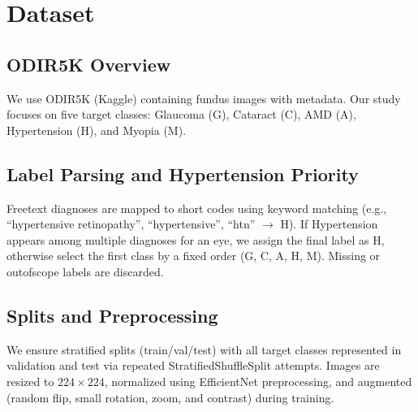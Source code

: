\chapter{Dataset}\label{sec:dataset}
\section{ODIR\textendash 5K Overview}
We use ODIR\textendash 5K (Kaggle) \cite{odir5k} containing fundus images with metadata. Our study focuses on five target classes: Glaucoma (G), Cataract (C), AMD (A), Hypertension (H), and Myopia (M).

\section{Label Parsing and Hypertension Priority}
Free\textendash text diagnoses are mapped to short codes using keyword matching (e.g., ``hypertensive retinopathy'', ``hypertensive'', ``htn'' $\rightarrow$ H). If Hypertension appears among multiple diagnoses for an eye, we assign the final label as H, otherwise select the first class by a fixed order (G, C, A, H, M). Missing or out\textendash of\textendash scope labels are discarded.

\section{Splits and Preprocessing}
We ensure stratified splits (train/val/test) with all target classes represented in validation and test via repeated StratifiedShuffleSplit attempts. Images are resized to $224\times224$, normalized using EfficientNet preprocessing, and augmented (random flip, small rotation, zoom, and contrast) during training.

